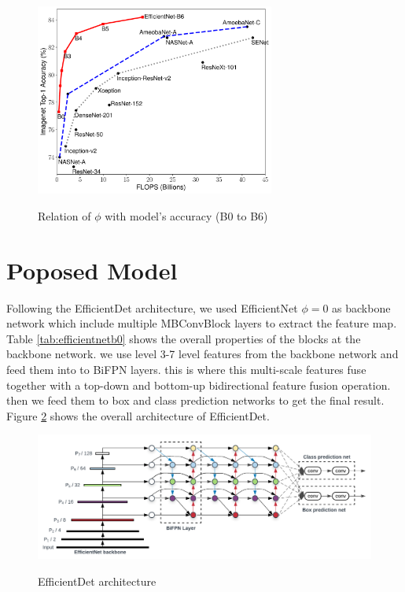 \documentclass[11pt]{article}
\begin{document}
\begin{figure}
	\centering
	\caption{Relation of $\phi$ with model's accuracy (B0 to B6)}
	\includegraphics[width=0.7\textwidth]{flops}
	\label{fig:flops}
\end{figure}

\section{Poposed Model}

Following the EfficientDet architecture, we used EfficientNet $\phi = 0$ as backbone network which include multiple MBConvBlock layers to extract the feature map. Table \ref{tab:efficientnetb0} shows the overall properties of the blocks at the backbone network. we use level 3-7 level features from the backbone network and feed them into to BiFPN layers. this is where this multi-scale features fuse together with a top-down and bottom-up bidirectional feature fusion operation. then we feed them to box and class prediction networks to get the final result. Figure \ref{fig:efficientdetarch} shows the overall architecture of EfficientDet.

\begin{figure}
	\centering
	\caption{EfficientDet architecture}
	\includegraphics[width=1.0\textwidth]{efficientdetarch}
	\label{fig:efficientdetarch}
\end{figure}
\end{document}
